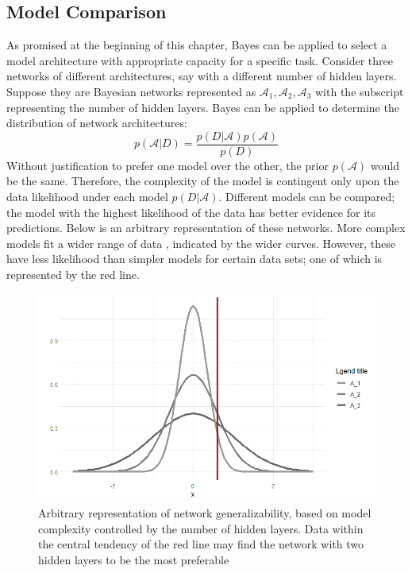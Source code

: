 
\subsection{Model Comparison}
As promised at the beginning of this chapter, Bayes can be applied to select a model architecture \cite{bishop1997bayesian} with appropriate capacity for a specific task.  Consider three networks of different architectures, say with a different number of hidden layers.  Suppose they are Bayesian networks represented as $\mathcal{A}_1, \mathcal{A}_2, \mathcal{A}_3$ with the subscript representing the number of hidden layers.  Bayes can be applied to determine the distribution of network architectures:
$$
p(\mathcal{A}|D) = \frac{p(D|\mathcal{A})p(\mathcal{A})}{p(D)}
$$
Without justification to prefer one model over the other, the prior $p(\mathcal{A})$ would be the same.  Therefore, the complexity of the model is contingent only upon the data likelihood under each model $p(D|\mathcal{A})$.  Different models can be compared; the model with the highest likelihood of the data has better evidence for its predictions. Below is an arbitrary representation of these networks.  More complex models fit a wider range of data \cite{bishop1997bayesian}, indicated by the wider curves.  However, these have less likelihood than simpler models for certain data sets; one of which is represented by the red line.

\begin{figure}[H]
    \centering
    \includegraphics[width = .6\textwidth]{Figures/BNN_modelcheck.png}
    \caption{\footnotesize{Arbitrary representation of network generalizability, based on model complexity controlled by the number of hidden layers. Data within the central tendency of the red line may find the network with two hidden layers to be the most preferable}}
    \label{BNNmodelcheck}
\end{figure}

